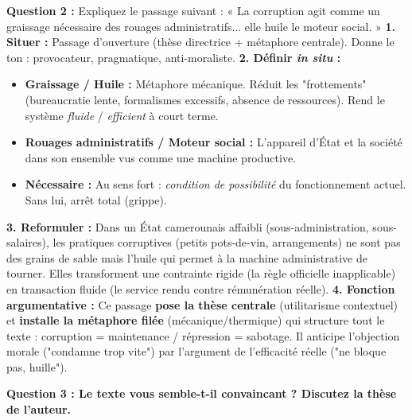 \documentclass[11pt]{article}
\begin{document}
\begin{exoresolu}
\textbf{Question 2 :} Expliquez le passage suivant : « La corruption agit comme un graissage nécessaire des rouages administratifs... elle huile le moteur social. » \tcblower
\textbf{1. Situer :} Passage d'ouverture (thèse directrice + métaphore centrale). Donne le ton : provocateur, pragmatique, anti-moraliste.
\textbf{2. Définir \emph{in situ} :}
\begin{itemize}
    \item \textbf{Graissage / Huile :} Métaphore mécanique. Réduit les "frottements" (bureaucratie lente, formalismes excessifs, absence de ressources). Rend le système \emph{fluide} / \emph{efficient} à court terme.
    \item \textbf{Rouages administratifs / Moteur social :} L'appareil d'État et la société dans son ensemble vus comme une machine productive.
    \item \textbf{Nécessaire :} Au sens fort : \emph{condition de possibilité} du fonctionnement actuel. Sans lui, arrêt total (grippe).
\end{itemize}
\textbf{3. Reformuler :} Dans un État camerounais affaibli (sous-administration, sous-salaires), les pratiques corruptives (petits pots-de-vin, arrangements) ne sont pas des grains de sable mais l'huile qui permet à la machine administrative de tourner. Elles transforment une contrainte rigide (la règle officielle inapplicable) en transaction fluide (le service rendu contre rémunération réelle).
\textbf{4. Fonction argumentative :} Ce passage \textbf{pose la thèse centrale} (utilitarisme contextuel) et \textbf{installe la métaphore filée} (mécanique/thermique) qui structure tout le texte : corruption = maintenance / répression = sabotage. Il anticipe l'objection morale ("condamne trop vite") par l'argument de l'efficacité réelle ("ne bloque pas, huille").
\end{exoresolu}

\textbf{Question 3 : Le texte vous semble-t-il convaincant ? Discutez la thèse de l'auteur.}
\end{document}
